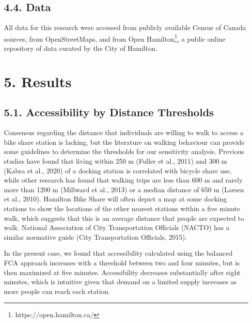 \documentclass[]{elsarticle} %
\begin{document}
\hypertarget{data}{%
\subsection{4.4. Data}\label{data}}

All data for this research were accessed from publicly available Census
of Canada sources, from OpenStreetMaps, and from Open
Hamilton\footnote{https://open.hamilton.ca/}, a public online repository
of data curated by the City of Hamilton.

\hypertarget{results}{%
\section{5. Results}\label{results}}

\hypertarget{accessibility-by-distance-thresholds}{%
\subsection{5.1. Accessibility by Distance
Thresholds}\label{accessibility-by-distance-thresholds}}

Consensus regarding the distance that individuals are willing to walk to
access a bike share station is lacking, but the literature on walking
behaviour can provide some guidelines to determine the thresholds for
our sensitivity analysis. Previous studies have found that living within
250 m (Fuller et al., 2011) and 300 m (Kabra et al., 2020) of a docking
station is correlated with bicycle share use, while other research has
found that walking trips are less than 600 m and rarely more than 1200 m
(Millward et al., 2013) or a median distance of 650 m (Larsen et al.,
2010). Hamilton Bike Share will often depict a map at some docking
stations to show the locations of the other nearest stations within a
five minute walk, which suggests that this is an average distance that
people are expected to walk. National Association of City Transportation
Officials (NACTO) has a similar normative guide (City Transportation
Officials, 2015).

In the present case, we found that accessibility calculated using the
balanced FCA approach increases with a threshold between two and four
minutes, but is then maximized at five minutes. Accessibility decreases
substantially after eight minutes, which is intuitive given that demand
on a limited supply increases as more people can reach each station.
\end{document}
